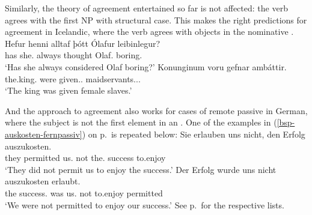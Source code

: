 Similarly, the theory of agreement entertained so far is not affected: the verb agrees with the
first NP with structural case. This makes the right predictions for agreement in Icelandic, where
the verb agrees with objects in the nominative \citep[]{ZMT85a}.
\eal
\ex
\gll Hefur henni      alltaf þótt    Ólafur      leibinlegur?\footnotemark\\
     has   she.\DAT{} always thought Olaf.\NOM{} boring.\NOM{}\\\icelandic
{}
\glt `Has she always considered Olaf boring?'
\ex
\label{ex-dat-subj-passive-ditransitive-icelandic-two}
\gll Konunginum voru gefnar ambáttir.\footnotemark\\
     the.king.\DAT{} were given.\F.\PL{} maidservants.\NOM.\F.\PL\\
\glt `The king was given female slaves.'
\zl

And the approach to agreement also works for cases of remote passive in German, where the subject is not the first element
in an \argstl. One of the examples in (\ref{bsp-auskosten-fernpassiv}) on
p.\,\pageref{bsp-auskosten-fernpassiv} is repeated below:
\eal
\ex 
\gll Sie erlauben uns nicht, den Erfolg auszukosten.\\
     they permitted us.\DAT{} not the.\ACC{} success to.enjoy\\
\glt `They did not permit us to enjoy the success.'
\ex{}
\gll Der Erfolg         wurde uns      nicht auszukosten erlaubt.\footnotemark\\
     the success.\NOM{} was   us.\DAT{} not   to.enjoy                  permitted\\
\glt `We were not permitted to enjoy our success.'%
\label{bsp-auskosten-fernpassiv-haider-zwei}
\zl
See p.\,\pageref{ex-arg-st-fernpassiv-object-control} for the respective \argst lists.

